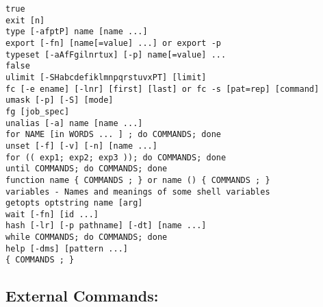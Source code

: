 \documentclass[10pt,a4paper,draft]{article}
\begin{document}
\begin{verbatim}
true
exit [n]
type [-afptP] name [name ...]
export [-fn] [name[=value] ...] or export -p
typeset [-aAfFgilnrtux] [-p] name[=value] ...
false
ulimit [-SHabcdefiklmnpqrstuvxPT] [limit]
fc [-e ename] [-lnr] [first] [last] or fc -s [pat=rep] [command]
umask [-p] [-S] [mode]
fg [job_spec]
unalias [-a] name [name ...]
for NAME [in WORDS ... ] ; do COMMANDS; done
unset [-f] [-v] [-n] [name ...]
for (( exp1; exp2; exp3 )); do COMMANDS; done
until COMMANDS; do COMMANDS; done
function name { COMMANDS ; } or name () { COMMANDS ; }
variables - Names and meanings of some shell variables
getopts optstring name [arg]
wait [-fn] [id ...]
hash [-lr] [-p pathname] [-dt] [name ...]
while COMMANDS; do COMMANDS; done
help [-dms] [pattern ...]
{ COMMANDS ; }
\end{verbatim}

\subsection{External Commands:}
\end{document}
